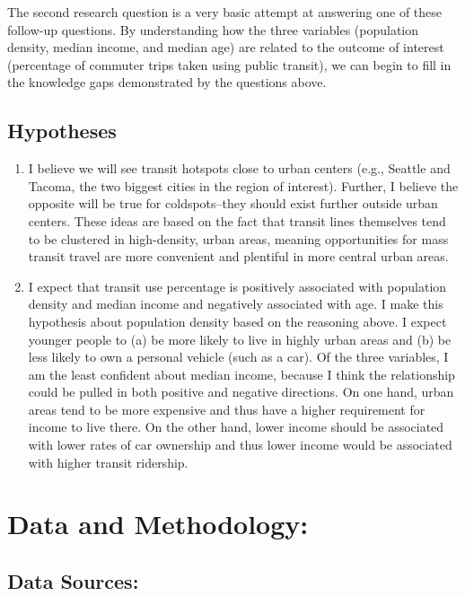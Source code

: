 \documentclass[
]{article}
\providecommand{\tightlist}{%
  \setlength{\itemsep}{0pt}\setlength{\parskip}{0pt}}
\begin{document}
The second research question is a very basic attempt at answering one of
these follow-up questions. By understanding how the three variables
(population density, median income, and median age) are related to the
outcome of interest (percentage of commuter trips taken using public
transit), we can begin to fill in the knowledge gaps demonstrated by the
questions above.

\subsection{Hypotheses}\label{hypotheses}

\begin{enumerate}
\def\labelenumi{\arabic{enumi}.}
\tightlist
\item
  I believe we will see transit hotspots close to urban centers (e.g.,
  Seattle and Tacoma, the two biggest cities in the region of interest).
  Further, I believe the opposite will be true for coldspots--they
  should exist further outside urban centers. These ideas are based on
  the fact that transit lines themselves tend to be clustered in
  high-density, urban areas, meaning opportunities for mass transit
  travel are more convenient and plentiful in more central urban areas.
\item
  I expect that transit use percentage is positively associated with
  population density and median income and negatively associated with
  age. I make this hypothesis about population density based on the
  reasoning above. I expect younger people to (a) be more likely to live
  in highly urban areas and (b) be less likely to own a personal vehicle
  (such as a car). Of the three variables, I am the least confident
  about median income, because I think the relationship could be pulled
  in both positive and negative directions. On one hand, urban areas
  tend to be more expensive and thus have a higher requirement for
  income to live there. On the other hand, lower income should be
  associated with lower rates of car ownership and thus lower income
  would be associated with higher transit ridership.
\end{enumerate}

\section{Data and Methodology:}\label{data-and-methodology}

\subsection{Data Sources:}\label{data-sources}
\end{document}
